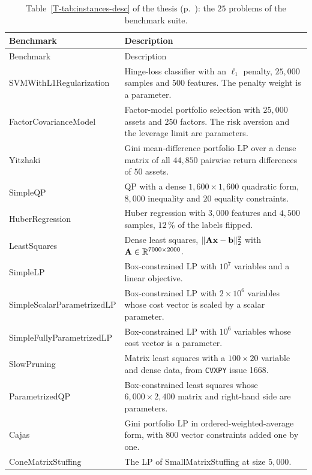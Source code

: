\documentclass[letterpaper,12pt]{article}
\newcommand{\ac}[1]{#1}
\newcommand{\tpage}[1]{p.~\pageref{T-#1}}
\begin{document}
{\small
\begin{longtable}{l >{\raggedright\arraybackslash}p{9.6cm}}
\caption{Table~\ref{T-tab:instances-desc} of the thesis (\tpage{tab:instances-desc}): the $25$ problems of the benchmark suite.}\label{tab:new-desc}\\
\toprule
Benchmark & Description \\
\midrule
\endfirsthead
\toprule
Benchmark & Description \\
\midrule
\endhead
\bottomrule
\endfoot
SVMWithL1Regularization & Hinge-loss classifier with an $\ell_1$ penalty, $25{,}000$ samples and $500$ features. The penalty weight is a parameter. \\
FactorCovarianceModel & Factor-model portfolio selection with $25{,}000$ assets and $250$ factors. The risk aversion and the leverage limit are parameters. \\
Yitzhaki & Gini mean-difference portfolio \ac{LP} over a dense matrix of all $44{,}850$ pairwise return differences of $50$ assets. \\
SimpleQP & \ac{QP} with a dense $1{,}600 \times 1{,}600$ quadratic form, $8{,}000$ inequality and $20$ equality constraints. \\
HuberRegression & Huber regression with $3{,}000$ features and $4{,}500$ samples, $12\,\%$ of the labels flipped. \\
LeastSquares & Dense least squares, $\lVert \mathbf{A}\mathbf{x} - \mathbf{b} \rVert_2^2$ with $\mathbf{A} \in \mathbb{R}^{7000 \times 2000}$. \\
SimpleLP & Box-constrained \ac{LP} with $10^7$ variables and a linear objective. \\
SimpleScalarParametrizedLP & Box-constrained \ac{LP} with $2 \times 10^6$ variables whose cost vector is scaled by a scalar parameter. \\
SimpleFullyParametrizedLP & Box-constrained \ac{LP} with $10^6$ variables whose cost vector is a parameter. \\
SlowPruning & Matrix least squares with a $100 \times 20$ variable and dense data, from \texttt{CVXPY} issue 1668. \\
ParametrizedQP & Box-constrained least squares whose $6{,}000 \times 2{,}400$ matrix and right-hand side are parameters. \\
Cajas & Gini portfolio \ac{LP} in ordered-weighted-average form, with $800$ vector constraints added one by one. \\
ConeMatrixStuffing & The \ac{LP} of SmallMatrixStuffing at size $5{,}000$. \\

\end{longtable}}
\end{document}
